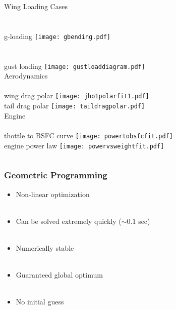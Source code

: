 \documentclass{beamer}
\begin{document}
\begin{frame}

    \begin{columns}
        Wing Loading Cases \\~\\~\\
        \footnotesize
        g-loading
        \texttt{[image: gbending.pdf]} 
        \\~\\~\\
        gust loading
        \texttt{[image: gustloaddiagram.pdf]} \\
        
        \normalsize
        Aerodynamics \\~\\
        \footnotesize
        wing drag polar
        \texttt{[image: jho1polarfit1.pdf]} \\
        tail drag polar
        \texttt{[image: taildragpolar.pdf]} \\
        
        \normalsize
        Engine \\~\\
        \footnotesize
        thottle to BSFC curve
        \texttt{[image: powertobsfcfit.pdf]} \\
        engine power law
        \texttt{[image: powervsweightfit.pdf]} \\
    \end{columns}
    
\end{frame}


\begin{frame}
    \frametitle{Geometric Programming}
    \begin{itemize}
        \pause
        \item Non-linear optimization \\~\\
        \pause
        \item Can be solved extremely quickly ($\sim 0.1$ sec)\\~\\
        \pause
        \item Numerically stable \\~\\
        \pause
        \item Guaranteed global optimum \\~\\
        \pause
        \item No initial guess
        \end{itemize}
\end{frame}
\end{document}
